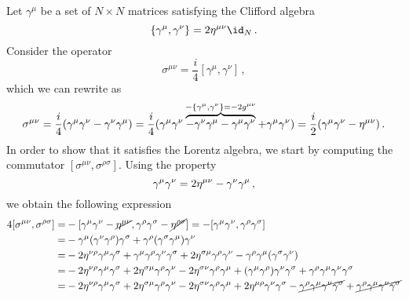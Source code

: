 \begin{sol}
    Let $\gamma^\mu$ be a set of $N \times N$ matrices satisfying the Clifford algebra 
    \begin{equation}
        \{\gamma^\mu, \gamma^\nu\} = 2 \g^{\mu \nu} \id_N \, .
    \end{equation}
    Consider the operator 
    \begin{equation}
        \sigma^{\mu\nu} = \frac{i}{4} [\gamma^\mu, \gamma^\nu] \, ,
    \end{equation}
    which we can rewrite as
    \begin{equation}
        \sigma^{\mu\nu} = \frac{i}{4} (\gamma^\mu \gamma^\nu - \gamma^\nu \gamma^\mu) = \frac{i}{4} (\gamma^\mu \gamma^\nu \overbrace{- \gamma^\nu \gamma^\mu - \gamma^\mu \gamma^\nu}^{-\{\gamma^\mu, \gamma^\nu\} =-2g^{\mu\nu}} + \gamma^\mu \gamma^\nu) = \frac{i}{2} (\gamma^\mu \gamma^\nu - \eta^{\mu \nu}) \, .
    \end{equation}
    In order to show that it satisfies the Lorentz algebra, we start by computing the commutator $[\sigma^{\mu\nu} , \sigma^{\rho\sigma}]$. Using the property 
    \begin{equation}
        \gamma^\mu \gamma^\nu = 2 \eta^{\mu \nu} - \gamma^\nu \gamma^\mu \, ,
    \end{equation}
    we obtain the following expression
    \begin{equation}
    \begin{split}
        4 [\sigma^{\mu\nu} , \sigma^{\rho\sigma}] = & -[\gamma^\mu \gamma^\nu - \cancel{\g^{\mu \nu}} , \gamma^\rho \gamma^\sigma - \cancel{\g^{\rho \sigma}}] = -[\gamma^\mu \gamma^\nu , \gamma^\rho \gamma^\sigma] \\
        = & - \gamma^\mu (\gamma^\nu \gamma^\rho) \gamma^\sigma + \gamma^\rho (\gamma^\sigma \gamma^\mu) \gamma^\nu \\
        = & - 2\g^{\nu\rho} \gamma^\mu \gamma^\sigma + \gamma^\mu \gamma^\rho \gamma^\nu \gamma^\sigma + 2\g^{\sigma\mu} \gamma^\rho \gamma^\nu - \gamma^\rho \gamma^\mu (\gamma^\sigma \gamma^\nu) \\
        = & - 2\g^{\nu\rho} \gamma^\mu \gamma^\sigma + 2\g^{\sigma\mu} \gamma^\rho \gamma^\nu - 2\g^{\sigma\nu} \gamma^\rho \gamma^\mu + (\gamma^\mu \gamma^\rho) \gamma^\nu \gamma^\sigma + \gamma^\rho \gamma^\mu \gamma^\nu \gamma^\sigma \\
        = & - 2\g^{\nu\rho} \gamma^\mu \gamma^\sigma + 2\g^{\sigma\mu} \gamma^\rho \gamma^\nu - 2\g^{\sigma\nu} \gamma^\rho \gamma^\mu + 2\g^{\mu\rho} \gamma^\nu \gamma^\sigma - \cancel{\gamma^\rho \gamma^\mu \gamma^\nu \gamma^\sigma} + \cancel{\gamma^\rho \gamma^\mu \gamma^\nu \gamma^\sigma} \\

\end{split}
\end{equation}
\end{sol}
